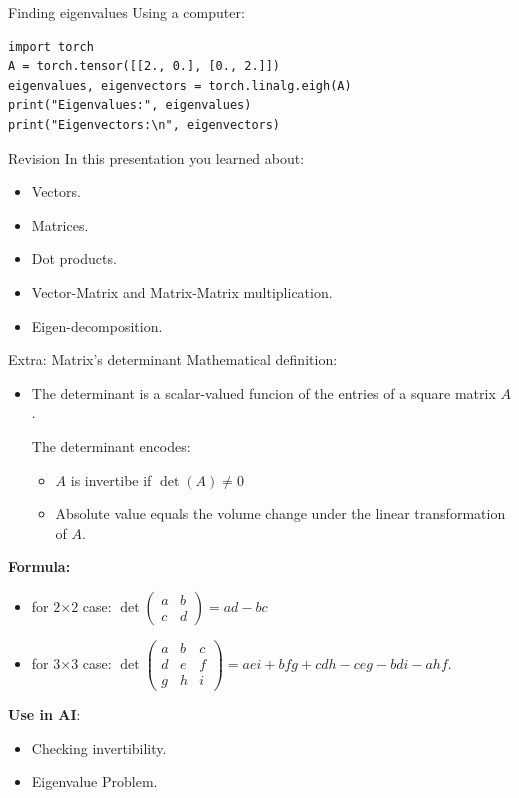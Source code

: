 \documentclass{beamer}
\begin{document}
\begin{frame}[fragile]{Finding eigenvalues}
Using a computer:
\begin{lstlisting}
import torch
A = torch.tensor([[2., 0.], [0., 2.]])
eigenvalues, eigenvectors = torch.linalg.eigh(A)
print("Eigenvalues:", eigenvalues)
print("Eigenvectors:\n", eigenvectors)
\end{lstlisting}
\end{frame}

\begin{frame}{Revision}
In this presentation you learned about:
    \begin{itemize}
        \item Vectors.
        \item Matrices.
        \item Dot products.
        \item Vector-Matrix and Matrix-Matrix multiplication.
        \item Eigen-decomposition.
    \end{itemize}
    
\end{frame}

\begin{frame}{Extra: Matrix's determinant}
	Mathematical definition:
	\begin{itemize}
		\item The determinant is a scalar-valued funcion of the entries of a square matrix $A$.
		
		The determinant encodes:
		\begin{itemize}
			\item$A$ is invertibe if $\det(A) \neq 0$
			\item Absolute value equals the volume change under the linear transformation of $A$.
		\end{itemize}
	\end{itemize}
	\textbf{Formula:}
	\begin{itemize}
		\item for $2$×$2$ case: $\det\begin{pmatrix} a & b \\ c & d \end{pmatrix} = ad - bc$
		\item for $3$×$3$ case: $\det \begin{pmatrix} a & b & c \\ d & e & f \\ g & h & i \end{pmatrix} = aei + bfg + cdh - ceg - bdi - ahf$.
	\end{itemize}
	\textbf{Use in AI}:
	\begin{itemize}
		\item Checking invertibility.
		\item Eigenvalue Problem.
	\end{itemize}
\end{frame}
\end{document}
